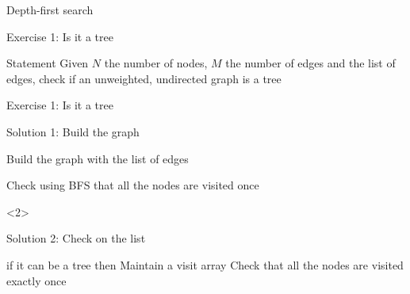 \documentclass{beamer}
\begin{document}
\begin{frame}{Depth-first search}
\begin{overlayarea}{\textwidth}{\textheight}
{\begin{block}{}
  \end{block}}
  \end{overlayarea}
\end{frame}


\begin{frame}{Exercise 1: Is it a tree}
  \begin{overlayarea}{\textwidth}{\textheight}
  \begin{block}{Statement}
    Given $N$ the number of nodes, $M$ the number of edges and the list of edges, check if an unweighted, undirected graph is a tree
  \end{block}
  
  
  
  \end{overlayarea}
\end{frame}

\begin{frame}[fragile]{Exercise 1: Is it a tree}

  \begin{code}{Solution 1: Build the graph}
    \begin{PseudoCode}
Build the graph with the list of edges

Check using BFS that all the nodes are visited once
    \end{PseudoCode}
  \end{code}
  
  \begin{uncoverenv}<2>  
  \begin{code}{Solution 2: Check on the list}
    \begin{PseudoCode}
if it can be a tree then
    Maintain a visit array
    Check that all the nodes are visited exactly once
    \end{PseudoCode}
  \end{code}
  \end{uncoverenv}
\end{frame}
\end{document}
